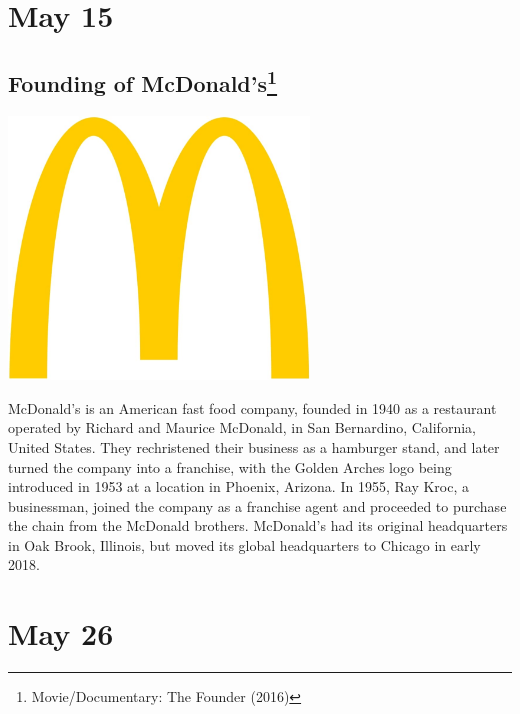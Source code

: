 \documentclass[11pt]{report}
\begin{document}
\section{May 15}
\subsection{Founding of McDonald's\protect\footnote{Movie/Documentary: The Founder (2016)}}
\vspace{2mm}\begin{center}\includegraphics[width=8cm]{./img/mcdonaldsLogo.jpg}\end{center}
McDonald's is an American fast food company, founded in 1940 as a restaurant operated by Richard and Maurice McDonald, in San Bernardino, California, United States. They rechristened their business as a hamburger stand, and later turned the company into a franchise, with the Golden Arches logo being introduced in 1953 at a location in Phoenix, Arizona. In 1955, Ray Kroc, a businessman, joined the company as a franchise agent and proceeded to purchase the chain from the McDonald brothers. McDonald's had its original headquarters in Oak Brook, Illinois, but moved its global headquarters to Chicago in early 2018.
\section{May 26}
\end{document}
